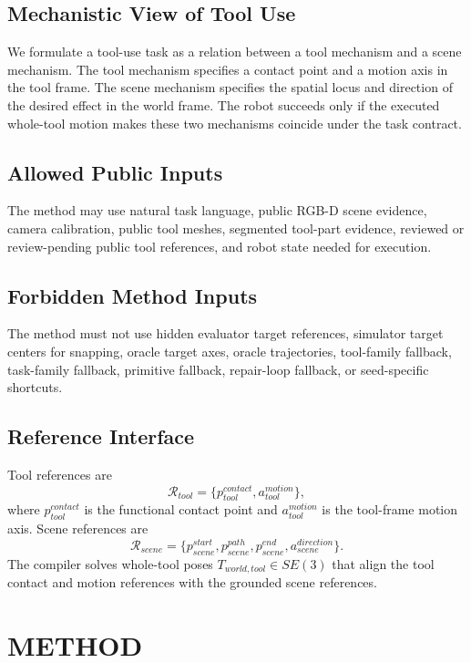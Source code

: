 \documentclass[letterpaper, 10 pt, conference]{ieeeconf}
\begin{document}
\subsection{Mechanistic View of Tool Use}
We formulate a tool-use task as a relation between a tool mechanism and a scene
mechanism. The tool mechanism specifies a contact point and a motion axis in
the tool frame. The scene mechanism specifies the spatial locus and direction
of the desired effect in the world frame. The robot succeeds only if the
executed whole-tool motion makes these two mechanisms coincide under the task
contract.

\subsection{Allowed Public Inputs}
The method may use natural task language, public RGB-D scene evidence, camera
calibration, public tool meshes, segmented tool-part evidence, reviewed or
review-pending public tool references, and robot state needed for execution.

\subsection{Forbidden Method Inputs}
The method must not use hidden evaluator target references, simulator target
centers for snapping, oracle target axes, oracle trajectories, tool-family
fallback, task-family fallback, primitive fallback, repair-loop fallback, or
seed-specific shortcuts.

\subsection{Reference Interface}
Tool references are
\begin{equation}
  \mathcal{R}_{tool} =
  \{p^{contact}_{tool}, a^{motion}_{tool}\},
\end{equation}
where $p^{contact}_{tool}$ is the functional contact point and
$a^{motion}_{tool}$ is the tool-frame motion axis. Scene references are
\begin{equation}
  \mathcal{R}_{scene} =
  \{p^{start}_{scene}, p^{path}_{scene}, p^{end}_{scene},
  a^{direction}_{scene}\}.
\end{equation}
The compiler solves whole-tool poses $T_{world,tool}\in SE(3)$ that align the
tool contact and motion references with the grounded scene references.

\section{METHOD}
\end{document}
